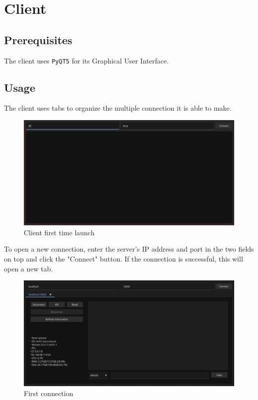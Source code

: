 \documentclass{article}
\begin{document}
\newpage
\section{Client}
\subsection{Prerequisites}
The client uses \verb|PyQT5| for its Graphical User Interface.

\subsection{Usage}
The client uses tabs to organize the multiple connection it is able to make.

\begin{figure}[H]
    \begin{center}
        \includegraphics[width=0.8\linewidth]{fig/first.png}
    \end{center}
    \caption{Client first time launch}
    \label{client:default}
\end{figure}

To open a new connection, enter the server's IP address and port in the two
fields on top and click the "Connect" button. If the connection is successful,
this will open a new tab.

\begin{figure}[H]
    \begin{center}
        \includegraphics[width=0.8\linewidth]{fig/connected.png}
    \end{center}
    \caption{First connection}
    \label{client:connected}
\end{figure}
\end{document}
